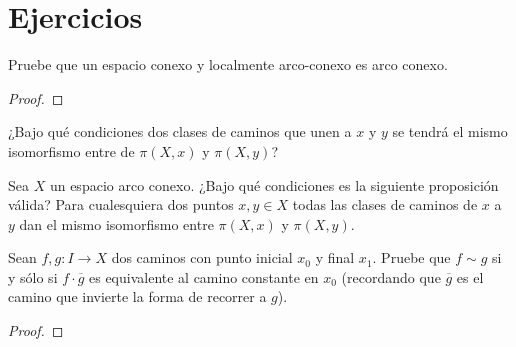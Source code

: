 \documentclass[12pt]{report}
\theoremstyle{largebreak}
\newcommand\cf[3]{\ensuremath{#1:#2\rightarrow#3}}
\begin{document}
    \newpage

    \section{Ejercicios}

    \begin{excer}
        Pruebe que un espacio conexo y localmente arco-conexo es arco conexo.
    \end{excer}

    \begin{proof}
        
    \end{proof}

    \begin{excer}
        ¿Bajo qué condiciones dos clases de caminos que unen a $x$ y $y$ se tendrá el mismo isomorfismo entre de $\pi(X,x)$ y $\pi(X,y)$?
    \end{excer}

    \begin{sol}
        
    \end{sol}

    \begin{excer}
        Sea $X$ un espacio arco conexo. ¿Bajo qué condiciones es la siguiente proposición válida? Para cualesquiera dos puntos $x,y\in X$ todas las clases de caminos de $x$ a $y$ dan el mismo isomorfismo entre $\pi(X,x)$ y $\pi(X,y)$. 
    \end{excer}

    \begin{sol}
        
    \end{sol}

    \begin{excer}
        Sean $\cf{f,g}{I}{X}$ dos caminos con punto inicial $x_0$ y final $x_1$. Pruebe que $f\sim g$ si y sólo si $f\cdot\overline{g}$ es equivalente al camino constante en $x_0$ (recordando que $\overline{g}$ es el camino que invierte la forma de recorrer a $g$).
    \end{excer}

    \begin{proof}
        
    \end{proof}
\end{document}
